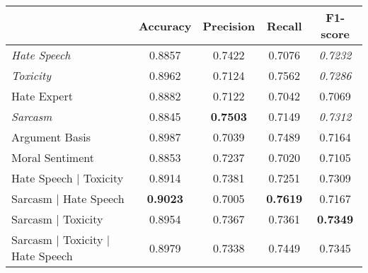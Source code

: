 \begin{table}[h]
  \centering
  \begin{tabular}{l|cccc}
                                                         & Accuracy        & Precision       & Recall          & F1-score        \\ \hline
    \textit{Hate Speech}                                 & 0.8857          & 0.7422          & 0.7076          & \textit{0.7232} \\
    \textit{Toxicity}                                    & 0.8962          & 0.7124          & 0.7562          & \textit{0.7286} \\
    Hate Expert                                          & 0.8882          & 0.7122          & 0.7042          & 0.7069          \\
    \textit{Sarcasm}                                     & 0.8845          & \textbf{0.7503} & 0.7149          & \textit{0.7312} \\
    Argument Basis                                       & 0.8987          & 0.7039          & 0.7489          & 0.7164          \\
    Moral Sentiment                                      & 0.8853          & 0.7237          & 0.7020          & 0.7105          \\\hline
    Hate Speech | Toxicity                               & 0.8914          & 0.7381          & 0.7251          & 0.7309          \\
    Sarcasm | Hate Speech                                & \textbf{0.9023} & 0.7005          & \textbf{0.7619} & 0.7167          \\
    Sarcasm | Toxicity                                   & 0.8954          & 0.7367          & 0.7361          & \textbf{0.7349} \\
    Sarcasm | Toxicity | Hate Speech                     & 0.8979          & 0.7338          & 0.7449          & 0.7345          \\

\end{tabular}
\end{table}
